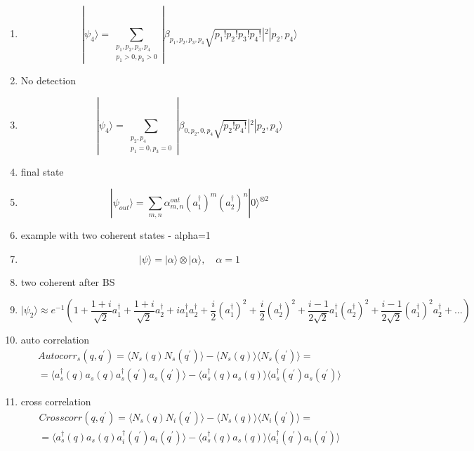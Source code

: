 \documentclass[12pt]{article}
\begin{document}
\begin{enumerate}
\item $$ |\psi_4\rangle = \sum_{\substack{p_{1},p_{2},p_{3},p_{4} \\ p_{1} > 0, p_{3}>0}} |\beta_{p_{1},p_{2},p_{3},p_{4}} \sqrt{p_{1}!p_{2}!p_{3}!p_{4}!}|^2 |p_{2}, p_{4}\rangle $$

\item No detection

\item $$ |\psi_4\rangle = \sum_{\substack{p_{2},p_{4} \\ p_{1}=0, p_{3}=0}} |\beta_{0,p_{2},0,p_{4}} \sqrt{p_{2}!p_{4}!}|^2 |p_{2}, p_{4}\rangle $$



\item final state

\item $$ |\psi_{out}\rangle = \sum_{m,n} \alpha_{m,n}^{out} (a_{1}^{\dag})^{m} (a_{2}^{\dag})^{n} |0\rangle^{\otimes 2}  $$

\item example with two coherent states - alpha=1

\item $$ |\psi\rangle = |\alpha\rangle \otimes |\alpha\rangle, \quad \alpha = 1 $$


\item two coherent after BS
\item $$ |\psi_{2}\rangle \approx  e^{-1} (1 + \frac{1 + i}{\sqrt{2}}a_{1}^{\dag} + \frac{1 + i}{\sqrt{2}}a_{2}^{\dag} + ia_{1}^{\dag}a_{2}^{\dag} + \frac{i}{2}(a_{1}^{\dag})^{2} + \frac{i}{2}(a_{2}^{\dag})^{2} + \frac{i - 1}{2\sqrt{2}}a_{1}^{\dag}(a_{2}^{\dag})^{2} + \frac{i - 1}{2\sqrt{2}}(a_{1}^{\dag})^{2}a_{2}^{\dag} + ... ) $$


\item auto correlation
\begin{equation*}
	\begin{aligned}
	Autocorr_{s}(q, q^{'}) = \langle N_s(q)N_s(q^{'}) \rangle -  \langle N_s(q) \rangle \langle N_s(q^{'})\rangle = \\
	= \langle a_{s}^{\dag}(q)a_{s}(q)a_{s}^{\dag}(q^{'})a_{s}(q^{'}) \rangle  -  \langle a_{s}^{\dag}(q)a_{s}(q) \rangle \langle a_{s}^{\dag}(q^{'})a_{s}(q^{'}) \rangle
	\end{aligned}
\end{equation*}


\item cross correlation
\begin{equation*}
	\begin{aligned}
	Crosscorr(q, q^{'}) = \langle N_s(q)N_i(q^{'}) \rangle -  \langle N_s(q) \rangle \langle N_i(q^{'}) \rangle = \\
	= \langle a_{s}^{\dag}(q)a_{s}(q)a_{i}^{\dag}(q^{'})a_{i}(q^{'}) \rangle  -  \langle a_{s}^{\dag}(q)a_{s}(q) \rangle \langle a_{i}^{\dag}(q^{'})a_{i}(q^{'}) \rangle
	\end{aligned}
\end{equation*}



\end{enumerate}
\end{document}
